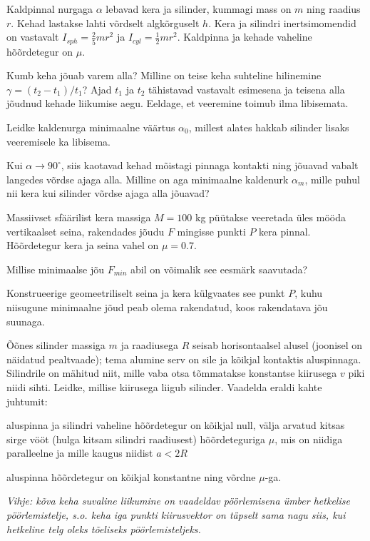 \documentclass[a4paper,11pt,twocolumn]{article}
\begin{document}
\begin{question}[E-S 2013, P6]
	Kaldpinnal nurgaga $ \alpha $ lebavad kera ja silinder, kummagi mass on $ m $ ning raadius $ r $. Kehad lastakse lahti võrdselt algkõrguselt $ h $. Kera ja silindri inertsimomendid on vastavalt $ I_{sph}=\frac{2}{5}mr^2 $ ja $ I_{cyl}=\frac{1}{2}mr^{2} $. Kaldpinna ja kehade vaheline hõõrdetegur on $ \mu $.
	\begin{subquestion}
		\item Kumb keha jõuab varem alla? Milline on teise keha suhteline hilinemine $ \gamma = (t_2 − t_1)/t_1 $? Ajad $ t_1 $ ja $ t_2 $ tähistavad vastavalt esimesena ja teisena alla jõudnud kehade liikumise aegu. Eeldage, et veeremine toimub ilma libisemata.
		\item Leidke kaldenurga minimaalne väärtus $ \alpha_0 $, millest alates hakkab silinder lisaks veeremisele ka libisema.
		\item Kui $ \alpha \rightarrow  90^\circ$, siis kaotavad	kehad mõistagi pinnaga kontakti ning jõuavad vabalt langedes võrdse ajaga alla. Milline on aga minimaalne kaldenurk $ \alpha_m $, mille puhul nii kera kui silinder võrdse ajaga alla jõuavad?
	\end{subquestion}
\end{question}
\begin{question}[E-S 2010, P4]
	Massiivset sfäärilist kera massiga $ M = 100 $ kg püütakse veeretada üles mööda vertikaalset seina, rakendades jõudu $ F $ mingisse punkti $ P $ kera pinnal. Hõõrdetegur kera ja seina vahel on $  \mu = 0.7 $.
	\begin{subquestion}
		\item Millise minimaalse jõu $ F_{min} $ abil on võimalik see eesmärk
		saavutada?

		\item Konstrueerige geomeetriliselt seina ja kera külgvaates see punkt $ P $, kuhu niisugune minimaalne jõud peab olema rakendatud, koos rakendatava jõu suunaga.
	\end{subquestion}
\end{question}
\begin{question}[Lõppv 1998, G9][sta4][6cm]
	Õõnes silinder massiga $ m $ ja raadiusega $ R $ seisab horisontaalsel alusel (joonisel on näidatud pealtvaade); tema alumine serv on sile ja kõikjal kontaktis aluspinnaga. Silindrile on mähitud niit, mille vaba otsa tõmmatakse konstantse kiirusega $ v $ piki niidi sihti. Leidke, millise kiirusega liigub silinder. Vaadelda eraldi kahte juhtumit:
	\begin{subquestion}
		\item aluspinna ja silindri vaheline hõõrdetegur on kõikjal null, välja arvatud kitsas sirge vööt (hulga kitsam silindri raadiusest) hõõrdeteguriga $ \mu $, mis on niidiga paralleelne ja mille kaugus niidist $ a < 2R $
		\item aluspinna hõõrdetegur on kõikjal konstantne ning võrdne $ \mu $-ga. 
	\end{subquestion}\setlength{\parskip}{0pt}
	\textit{Vihje: kõva keha suvaline liikumine on vaadeldav pöörlemisena ümber hetkelise pöörlemistelje, s.o. keha iga punkti kiirusvektor on täpselt sama nagu siis, kui
	hetkeline telg oleks tõeliseks pöörlemisteljeks.}
\end{question}
\end{document}
